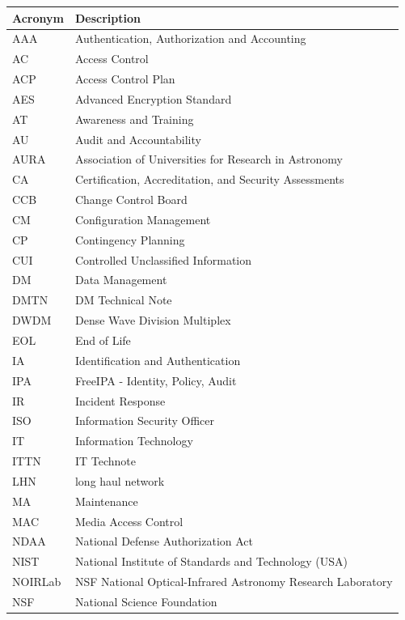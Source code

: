 \addtocounter{table}{-1}
\begin{longtable}{p{}p{}}\hline
\textbf{Acronym} & \textbf{Description}  \\\hline

AAA & Authentication, Authorization and Accounting \\\hline
AC & Access Control \\\hline
ACP & Access Control Plan \\\hline
AES & Advanced Encryption Standard \\\hline
AT & Awareness and Training \\\hline
AU & Audit and Accountability \\\hline
AURA & Association of Universities for Research in Astronomy \\\hline
CA & Certification, Accreditation, and Security Assessments \\\hline
CCB & Change Control Board \\\hline
CM & Configuration Management \\\hline
CP & Contingency Planning \\\hline
CUI & Controlled Unclassified Information \\\hline
DM & Data Management \\\hline
DMTN & DM Technical Note \\\hline
DWDM & Dense Wave Division Multiplex \\\hline
EOL & End of Life \\\hline
IA & Identification and Authentication \\\hline
IPA & FreeIPA - Identity, Policy, Audit \\\hline
IR & Incident Response \\\hline
ISO & Information Security Officer \\\hline
IT & Information Technology \\\hline
ITTN & IT Technote \\\hline
LHN & long haul network \\\hline
MA & Maintenance \\\hline
MAC & Media Access Control \\\hline
NDAA & National Defense Authorization Act \\\hline
NIST & National Institute of Standards and Technology (USA) \\\hline
NOIRLab & NSF National Optical-Infrared Astronomy Research Laboratory \\\hline
NSF & National Science Foundation \\\hline

\end{longtable}
